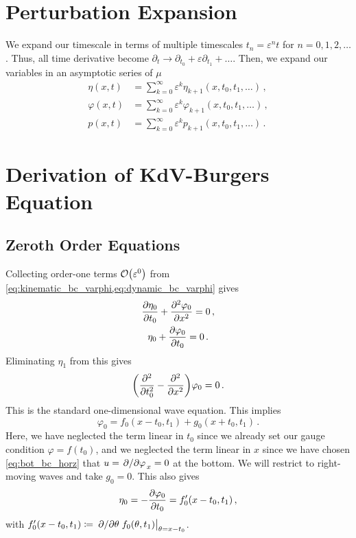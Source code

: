 \documentclass{jfm}
\renewcommand*{\epsilon}{\varepsilon}
\begin{document}
\section{Perturbation Expansion}
\label{sec:shallow_water}
We expand our timescale in terms of multiple timescales $t_n =
\epsilon^n t$ for $n= 0,1,2,\ldots$.
Thus, all time derivative become $\partial_t \to \partial_{t_0} +
\epsilon \partial_{t_1} + \ldots$.
Then, we expand our variables in an asymptotic series of $\mu$
\begin{align}
  \eta(x,t) &= \sum_{k=0}^{\infty} \epsilon^k
    \eta_{k+1}(x,t_0,t_1,\ldots) \,, \\
  \varphi(x,t) &= \sum_{k=0}^{\infty} \epsilon^k
    \varphi_{k+1}(x,t_0,t_1,\ldots) \,, \\
  p(x,t) &= \sum_{k=0}^{\infty} \epsilon^k p_{k+1}(x,t_0,t_1,\ldots)
    \,.
\end{align}

\section{Derivation of KdV-Burgers Equation}
\subsection{Zeroth Order Equations}
Collecting order-one terms $\order{\epsilon^0}$ from
\cref{eq:kinematic_bc_varphi,eq:dynamic_bc_varphi} gives
\begin{gather}
  \pdv{\eta_0}{t_0} + \pdv[2]{\varphi_0}{x} = 0 \,, \\
  \eta_0 + \pdv{\varphi_0}{t_0} = 0 \,.
\end{gather}
Eliminating $\eta_1$ from this gives
\begin{equation}
  \pqty{\pdv[2]{t_0} - \pdv[2]{x} } \varphi_0 = 0 \,.
  \label{eq:wave_eq}
\end{equation}
This is the standard one-dimensional wave equation.
This implies
\begin{equation}
  \varphi_0 = f_0(x-t_0,t_1) + g_0(x+t_0,t_1) \,.
  \label{eq:phi0_sol}
\end{equation}
Here, we have neglected the term linear in $t_0$ since we already set
our gauge condition $\varphi = f(t_0)$, and we neglected the term linear
in $x$ since we have chosen \cref{eq:bot_bc_horz} that $u =
\pdv*{\varphi}_x = 0$ at the bottom.
We will restrict to right-moving waves and take $g_0 = 0$.
This also gives
\begin{equation}
  \eta_0 = - \pdv{\varphi_0}{t_0} = f_0'(x-t_0,t_1) \,,
  \label{eq:eta0_sol}
\end{equation}
with $f_0'(x-t_0,t_1) \coloneqq \eval{\pdv*{\theta}
f_0(\theta,t_1)}_{\theta = x-t_0}$.
\end{document}
